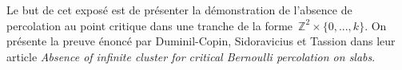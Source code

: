Le but de cet exposé est de présenter la démonstration de l'absence de percolation au point critique dans une tranche de la forme~$\mathbb{Z}^2\times\{0,...,k\}$. On présente la preuve énoncé par Duminil-Copin, Sidoravicius et Tassion dans leur article \emph{Absence of infinite cluster for critical Bernoulli percolation on slabs}.